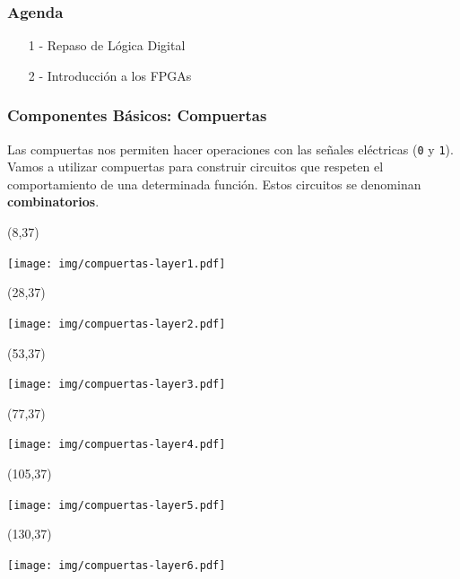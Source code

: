 \documentclass[aspectratio=169]{beamer}
\begin{document}
\begin{frame}[fragile]
    \frametitle{Agenda}
    \Large
    \begin{enumerate}
    \setlength\itemsep{1cm}
    \item[\LARGE 1 - ] Repaso de Lógica Digital
    \item[\LARGE 2 - ] Introducción a los FPGAs
    \end{enumerate}
\end{frame}

\begin{frame}[fragile,t]
    \frametitle{Componentes Básicos: Compuertas}
    Las compuertas nos permiten hacer operaciones con las señales eléctricas (\texttt{0} y \texttt{1}).\\
    \bigskip
    Vamos a utilizar compuertas para construir circuitos que respeten el comportamiento de una determinada función.
    Estos circuitos se denominan \textbf{combinatorios}.
    \bigskip
    \begin{textblock}{16}(8,37)   \begin{center} \texttt{[image: img/compuertas-layer1.pdf]} \end{center} \end{textblock}
    \begin{textblock}{21}(28,37)  \begin{center} \texttt{[image: img/compuertas-layer2.pdf]} \end{center} \end{textblock}
    \begin{textblock}{21}(53,37)  \begin{center} \texttt{[image: img/compuertas-layer3.pdf]} \end{center} \end{textblock}
    \begin{textblock}{21}(77,37)  \begin{center} \texttt{[image: img/compuertas-layer4.pdf]} \end{center} \end{textblock}
    \begin{textblock}{21}(105,37) \begin{center} \texttt{[image: img/compuertas-layer5.pdf]} \end{center} \end{textblock}
    \begin{textblock}{21}(130,37) \begin{center} \texttt{[image: img/compuertas-layer6.pdf]} \end{center} \end{textblock}

\end{frame}
\end{document}
